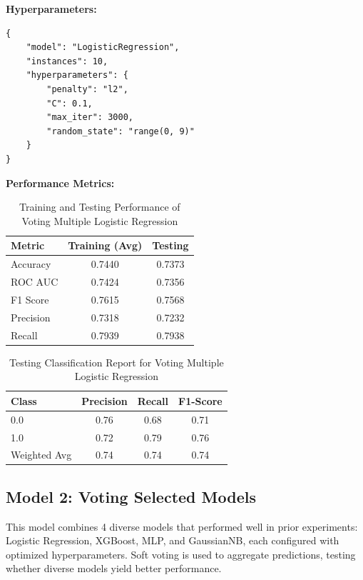 \textbf{Hyperparameters:}
\begin{verbatim}
{
    "model": "LogisticRegression",
    "instances": 10,
    "hyperparameters": {
        "penalty": "l2",
        "C": 0.1,
        "max_iter": 3000,
        "random_state": "range(0, 9)"
    }
}
\end{verbatim}

\textbf{Performance Metrics:}
\begin{table}[H]
\centering
\caption{Training and Testing Performance of Voting Multiple Logistic Regression}
\begin{tabular}{|l|c|c|}
\hline
\textbf{Metric} & \textbf{Training (Avg)} & \textbf{Testing} \\ \hline
Accuracy & 0.7440 & 0.7373 \\ \hline
ROC AUC & 0.7424 & 0.7356 \\ \hline
F1 Score & 0.7615 & 0.7568 \\ \hline
Precision & 0.7318 & 0.7232 \\ \hline
Recall & 0.7939 & 0.7938 \\ \hline
\end{tabular}
\end{table}

\begin{table}[H]
\centering
\caption{Testing Classification Report for Voting Multiple Logistic Regression}
\begin{tabular}{|l|c|c|c|}
\hline
\textbf{Class} & \textbf{Precision} & \textbf{Recall} & \textbf{F1-Score} \\ \hline
0.0 & 0.76 & 0.68 & 0.71 \\ \hline
1.0 & 0.72 & 0.79 & 0.76 \\ \hline
Weighted Avg & 0.74 & 0.74 & 0.74 \\ \hline
\end{tabular}
\end{table}

\subsection{Model 2: Voting Selected Models}
This model combines 4 diverse models that performed well in prior experiments: Logistic Regression, XGBoost, MLP, and GaussianNB, each configured with optimized hyperparameters. Soft voting is used to aggregate predictions, testing whether diverse models yield better performance.

